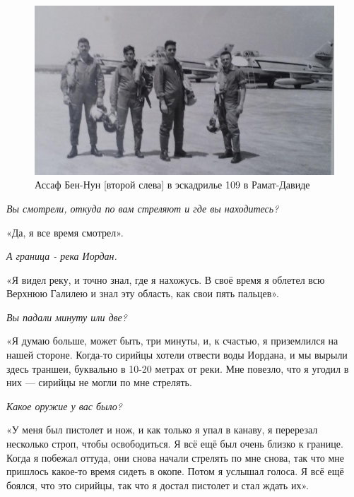 \begin{figure}[h!tb] 
	\centering\includegraphics[scale=0.4]{History_BenNun/Sch3Sv1MZmY.jpg}
	\caption{Ассаф Бен-Нун [второй слева] в эскадрилье 109 в Рамат-Давиде }%
\end{figure}

\textit{Вы смотрели, откуда по вам стреляют и где вы находитесь?}

«Да, я все время смотрел».

\textit{А граница - река Иордан.}

«Я видел реку, и точно знал, где я нахожусь. В своё время я облетел всю Верхнюю Галилею и знал эту область, как свои пять пальцев».

\textit{Вы падали минуту или две?}

«Я думаю больше, может быть, три минуты, и, к счастью, я приземлился на нашей стороне. Когда-то сирийцы хотели отвести воды Иордана, и мы вырыли здесь траншеи, буквально в 10-20 метрах от реки. Мне повезло, что я угодил в них — сирийцы не могли по мне стрелять.

\textit{Какое оружие у вас было?}

«У меня был пистолет и нож, и как только я упал в канаву, я перерезал несколько строп, чтобы освободиться. Я всё ещё был очень близко к границе. Когда я побежал оттуда, они снова начали стрелять по мне снова, так что мне пришлось какое-то время сидеть в окопе. Потом я услышал голоса. Я всё ещё боялся, что это сирийцы, так что я достал пистолет и стал ждать их».

